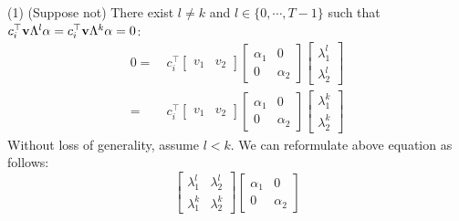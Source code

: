 {\begin{pf}
(1) %
 (Suppose not) %
There exist $l \neq k$ and $l \in \{ 0, \cdots, T-1 \}$ such that $c_i^\top {\bf v} \Lambda^l \alpha = c_i^\top {\bf v} \Lambda^k \alpha= 0$:
\begin{equation}
\begin{aligned}
0 = ~& c_i^\top \begin{bmatrix} v_1 & v_2 \end{bmatrix} \begin{bmatrix} \alpha_1 & 0 \\ 0 & \alpha_2 \end{bmatrix} \begin{bmatrix} \lambda_1^l \\ \lambda_2^l \end{bmatrix} \\
= ~ & c_i^\top \begin{bmatrix} v_1 & v_2 \end{bmatrix} \begin{bmatrix} \alpha_1 & 0 \\ 0 & \alpha_2 \end{bmatrix} \begin{bmatrix} \lambda_1^k \\ \lambda_2^k \end{bmatrix} \nonumber
\end{aligned}
\end{equation}
Without loss of generality, assume $l<k$. We can reformulate above equation as follows:
\begin{equation}
	\begin{bmatrix} \lambda_1^{l} & \lambda_2^l \\ \lambda_1^k & \lambda_2^k \end{bmatrix} \begin{bmatrix} \alpha_1 & 0 \\ 0 & \alpha_2 \end{bmatrix} 

\end{equation}
\end{pf}}
